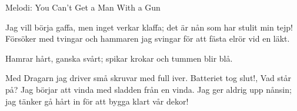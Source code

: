 \begin{song}

\begin{songmeta}
Melodi: You Can't Get a Man With a Gun
\end{songmeta}

\begin{songtext}
Jag vill börja gaffa,
men inget verkar klaffa;
det är nån som har stulit min tejp!
Försöker med tvingar
och hammaren jag svingar
för att fästa elrör vid en läkt.

Hamrar hårt,
ganska svårt;
spikar krokar och tummen blir blå.

Med Dragarn jag driver
små skruvar med full iver.
Batteriet tog slut!, Vad står på?
Jag börjar att vinda
med sladden från en vinda.
Jag ger aldrig upp nånsin;
jag tänker gå hårt in
för att bygga klart vår dekor!
\end{songtext}
\end{song}

